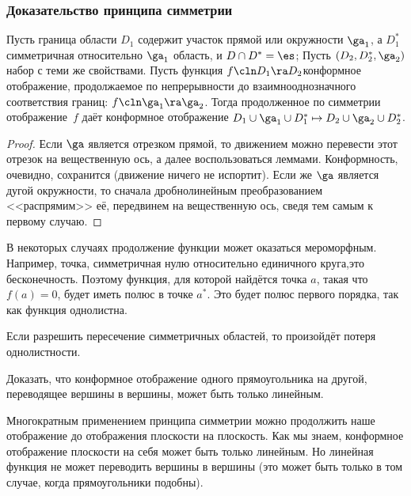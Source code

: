 \documentclass[a4paper]{article}
\begin{document}
\subsubsection{Доказательство принципа симметрии}

\begin{theorem}
Пусть граница области $D_1$ содержит участок прямой или окружности $\ga_1$, а $D_1^*$\т
симметричная относительно $\ga_1$ область, и $D \cap D^*=\es$;
Пусть $(D_2, D_2^*,\ga_2)$\т набор с теми же свойствами. Пусть функция $f\cln D_1\ra D_2$\т конформное
отображение, продолжаемое по непрерывности до взаимно\д однозначного соответствия границ: $f\cln \ga_1 \ra \ga_2$.
Тогда продолженное по симметрии отображение~$f$ даёт конформное отображение
$D_1\cup\ga_1\cup D_1^* \mapsto D_2\cup\ga_2\cup D_2^*$.
\end{theorem}
\begin{proof}
Если $\ga$ является отрезком прямой, то движением можно перевести этот отрезок на вещественную ось, а далее воспользоваться
леммами. Конформность, очевидно, сохранится (движение ничего не испортит). Если же $\ga$ является дугой окружности, то
сначала дробно\д линейным преобразованием <<распрямим>> её, передвинем на вещественную ось, сведя тем самым к первому случаю.
\end{proof}

\begin{note}
В некоторых случаях продолжение функции может оказаться мероморфным. Например, точка, симметричная нулю относительно
единичного круга,\т это бесконечность. Поэтому функция,  для которой найдётся точка $a$, такая что $f(a)=0$, будет
иметь полюс в точке $a^*$. Это будет полюс первого порядка, так как функция однолистна.
\end{note}

\begin{note}
Если разрешить пересечение симметричных областей, то произойдёт потеря однолистности.
\end{note}

\begin{problem}
Доказать, что конформное отображение одного прямоугольника на другой, переводящее вершины в вершины,
может быть только линейным.
\end{problem}
\begin{solution}
Многократным применением принципа симметрии можно продолжить наше отображение до отображения плоскости на плоскость.
Как мы знаем, конформное отображение плоскости на себя может быть только линейным.
Но линейная функция не может переводить вершины в вершины (это может быть только в том случае, когда прямоугольники
подобны).
\end{solution}
\end{document}
